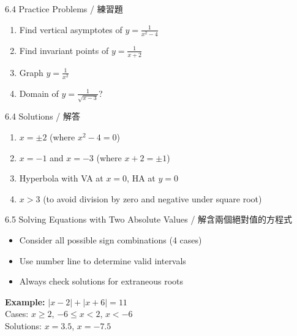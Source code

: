 \documentclass[aspectratio=169]{beamer}
\begin{document}
\begin{frame}{6.4 Practice Problems / 練習題}
    \begin{tcolorbox}[colback=lightgray,colframe=accent,title=Practice]
        \footnotesize
        \begin{enumerate}
            \item Find vertical asymptotes of $y = \frac{1}{x^2-4}$
            \item Find invariant points of $y = \frac{1}{x+2}$
            \item Graph $y = \frac{1}{x^2}$
            \item Domain of $y = \frac{1}{\sqrt{x-3}}$?
        \end{enumerate}
    \end{tcolorbox}
\end{frame}

\begin{frame}{6.4 Solutions / 解答}
    \begin{tcolorbox}[colback=lightgray,colframe=accent,title=Solutions]
        \footnotesize
        \begin{enumerate}
            \item $x = \pm 2$ (where $x^2-4 = 0$)
            \item $x = -1$ and $x = -3$ (where $x+2 = \pm 1$)
            \item Hyperbola with VA at $x = 0$, HA at $y = 0$
            \item $x > 3$ (to avoid division by zero and negative under square root)
        \end{enumerate}
    \end{tcolorbox}
\end{frame}

\begin{frame}{6.5 Solving Equations with Two Absolute Values / 解含兩個絕對值的方程式}
    \begin{tcolorbox}[colback=lightgray,colframe=primary,title=Key Points]
        \footnotesize
        \begin{itemize}
            \item Consider all possible sign combinations (4 cases)
            \item Use number line to determine valid intervals
            \item Always check solutions for extraneous roots
        \end{itemize}
    \end{tcolorbox}
    \vspace{0.5em}
    \begin{center}
    \textbf{Example:} $|x-2| + |x+6| = 11$\\
    Cases: $x \geq 2$, $-6 \leq x < 2$, $x < -6$\\
    Solutions: $x = 3.5$, $x = -7.5$
    \end{center}
\end{frame}
\end{document}

